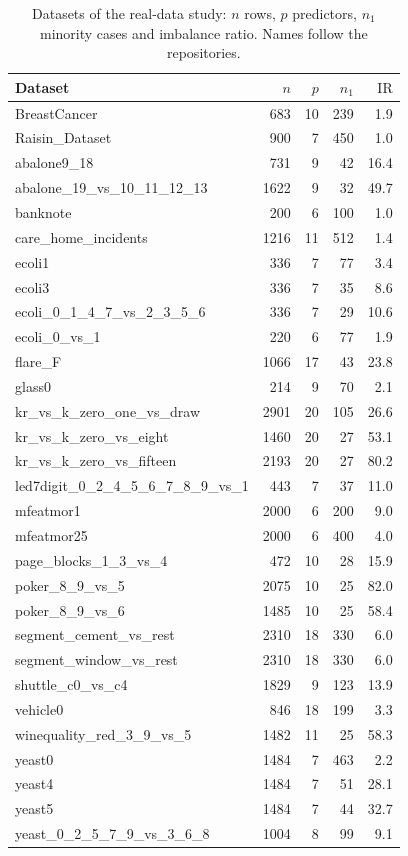 \documentclass[preprint,12pt]{elsarticle}
\newcommand{\IR}{\mathrm{IR}}
\begin{document}
\begin{table}[H]
\centering
\caption{Datasets of the real-data study: $n$ rows, $p$ predictors, $n_1$ minority cases and imbalance ratio. Names follow the repositories.}\label{tab:datasets}
\small\setlength{\tabcolsep}{4pt}
\begin{tabular}{lrrrr}
\toprule
Dataset & $n$ & $p$ & $n_1$ & $\IR$ \\
\midrule
BreastCancer & 683 & 10 & 239 & 1.9 \\
Raisin\_Dataset & 900 & 7 & 450 & 1.0 \\
abalone9\_18 & 731 & 9 & 42 & 16.4 \\
abalone\_19\_vs\_10\_11\_12\_13 & 1622 & 9 & 32 & 49.7 \\
banknote & 200 & 6 & 100 & 1.0 \\
care\_home\_incidents & 1216 & 11 & 512 & 1.4 \\
ecoli1 & 336 & 7 & 77 & 3.4 \\
ecoli3 & 336 & 7 & 35 & 8.6 \\
ecoli\_0\_1\_4\_7\_vs\_2\_3\_5\_6 & 336 & 7 & 29 & 10.6 \\
ecoli\_0\_vs\_1 & 220 & 6 & 77 & 1.9 \\
flare\_F & 1066 & 17 & 43 & 23.8 \\
glass0 & 214 & 9 & 70 & 2.1 \\
kr\_vs\_k\_zero\_one\_vs\_draw & 2901 & 20 & 105 & 26.6 \\
kr\_vs\_k\_zero\_vs\_eight & 1460 & 20 & 27 & 53.1 \\
kr\_vs\_k\_zero\_vs\_fifteen & 2193 & 20 & 27 & 80.2 \\
led7digit\_0\_2\_4\_5\_6\_7\_8\_9\_vs\_1 & 443 & 7 & 37 & 11.0 \\
mfeatmor1 & 2000 & 6 & 200 & 9.0 \\
mfeatmor25 & 2000 & 6 & 400 & 4.0 \\
page\_blocks\_1\_3\_vs\_4 & 472 & 10 & 28 & 15.9 \\
poker\_8\_9\_vs\_5 & 2075 & 10 & 25 & 82.0 \\
poker\_8\_9\_vs\_6 & 1485 & 10 & 25 & 58.4 \\
segment\_cement\_vs\_rest & 2310 & 18 & 330 & 6.0 \\
segment\_window\_vs\_rest & 2310 & 18 & 330 & 6.0 \\
shuttle\_c0\_vs\_c4 & 1829 & 9 & 123 & 13.9 \\
vehicle0 & 846 & 18 & 199 & 3.3 \\
winequality\_red\_3\_9\_vs\_5 & 1482 & 11 & 25 & 58.3 \\
yeast0 & 1484 & 7 & 463 & 2.2 \\
yeast4 & 1484 & 7 & 51 & 28.1 \\
yeast5 & 1484 & 7 & 44 & 32.7 \\
yeast\_0\_2\_5\_7\_9\_vs\_3\_6\_8 & 1004 & 8 & 99 & 9.1 \\
\bottomrule
\end{tabular}
\end{table}
\end{document}
